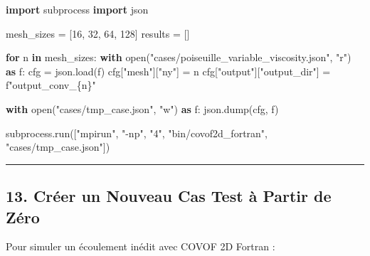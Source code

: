 \documentclass[
  french,
]{article}
\newenvironment{Shaded}{}{}
\newcommand{\BuiltInTok}[1]{\textcolor[rgb]{0.00,0.50,0.00}{#1}}
\newcommand{\ControlFlowTok}[1]{\textcolor[rgb]{0.00,0.44,0.13}{\textbf{#1}}}
\newcommand{\DecValTok}[1]{\textcolor[rgb]{0.25,0.63,0.44}{#1}}
\newcommand{\ImportTok}[1]{\textcolor[rgb]{0.00,0.50,0.00}{\textbf{#1}}}
\newcommand{\KeywordTok}[1]{\textcolor[rgb]{0.00,0.44,0.13}{\textbf{#1}}}
\newcommand{\NormalTok}[1]{#1}
\newcommand{\OperatorTok}[1]{\textcolor[rgb]{0.40,0.40,0.40}{#1}}
\newcommand{\SpecialCharTok}[1]{\textcolor[rgb]{0.25,0.44,0.63}{#1}}
\newcommand{\SpecialStringTok}[1]{\textcolor[rgb]{0.73,0.40,0.53}{#1}}
\newcommand{\StringTok}[1]{\textcolor[rgb]{0.25,0.44,0.63}{#1}}
\begin{document}
\begin{Shaded}
\begin{Highlighting}[]
\ImportTok{import}\NormalTok{ subprocess}
\ImportTok{import}\NormalTok{ json}

\NormalTok{mesh\_sizes }\OperatorTok{=}\NormalTok{ [}\DecValTok{16}\NormalTok{, }\DecValTok{32}\NormalTok{, }\DecValTok{64}\NormalTok{, }\DecValTok{128}\NormalTok{]}
\NormalTok{results }\OperatorTok{=}\NormalTok{ []}

\ControlFlowTok{for}\NormalTok{ n }\KeywordTok{in}\NormalTok{ mesh\_sizes:}
    \ControlFlowTok{with} \BuiltInTok{open}\NormalTok{(}\StringTok{"cases/poiseuille\_variable\_viscosity.json"}\NormalTok{, }\StringTok{"r"}\NormalTok{) }\ImportTok{as}\NormalTok{ f:}
\NormalTok{        cfg }\OperatorTok{=}\NormalTok{ json.load(f)}
\NormalTok{    cfg[}\StringTok{"mesh"}\NormalTok{][}\StringTok{"ny"}\NormalTok{] }\OperatorTok{=}\NormalTok{ n}
\NormalTok{    cfg[}\StringTok{"output"}\NormalTok{][}\StringTok{"output\_dir"}\NormalTok{] }\OperatorTok{=} \SpecialStringTok{f"output\_conv\_}\SpecialCharTok{\{}\NormalTok{n}\SpecialCharTok{\}}\SpecialStringTok{"}
    
    \ControlFlowTok{with} \BuiltInTok{open}\NormalTok{(}\StringTok{"cases/tmp\_case.json"}\NormalTok{, }\StringTok{"w"}\NormalTok{) }\ImportTok{as}\NormalTok{ f:}
\NormalTok{        json.dump(cfg, f)}
        
\NormalTok{    subprocess.run([}\StringTok{"mpirun"}\NormalTok{, }\StringTok{"{-}np"}\NormalTok{, }\StringTok{"4"}\NormalTok{, }\StringTok{"bin/covof2d\_fortran"}\NormalTok{, }\StringTok{"cases/tmp\_case.json"}\NormalTok{])}
\end{Highlighting}
\end{Shaded}

\begin{center}\rule{0.5\linewidth}{0.5pt}\end{center}

\subsection{13. Créer un Nouveau Cas Test à Partir de
Zéro}\label{cruxe9er-un-nouveau-cas-test-uxe0-partir-de-zuxe9ro}

Pour simuler un écoulement inédit avec COVOF 2D Fortran :
\end{document}
